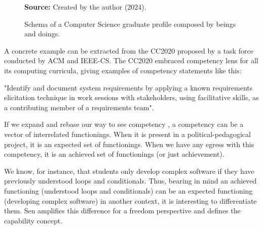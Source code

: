 \begin{figure}[ht!]
    \centering
    
    \caption{\textmd{Schema of a Computer Science graduate profile composed by beings and doings.}}
    \label{fig:graduate-profile}
    
    \par\medskip\ABNTEXfontereduzida\selectfont\textbf{Source:} Created by the author (2024). \par\medskip
\end{figure}

A concrete example can be extracted from the \gls{CC2020} proposed by a task force conducted by \gls{ACM} and \gls{IEEE-CS}. The \gls{CC2020} \cite[p.~52]{acm:2020} embraced competency lens for all its computing curricula, giving examples of competency statements like this:  
\begin{citacao}
    "Identify and document system requirements by applying a known requirements elicitation technique in work sessions with stakeholders, using facilitative skills, as a contributing member of a requirements team".  
\end{citacao}
If we expand and rebase our way to see competency \cite{lozano:2012}, a competency can be a vector of interrelated functionings. When it is present in a political-pedagogical project, it is an expected set of functionings. When we have any egress with this competency, it is an achieved set of functionings (or just achievement).

We know, for instance, that students only develop complex software if they have previously understood loops and conditionals. Thus, bearing in mind an achieved functioning (understood loops and conditionals) can be an expected functioning (developing complex software) in another context, it is interesting to differentiate them. Sen amplifies this difference for a freedom perspective and defines the capability concept.

